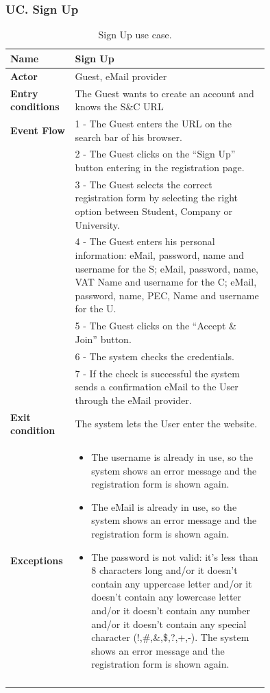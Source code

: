 \subsubsection*{UC\cuc . Sign Up}
\begin{center}
    \begin{longtable}{|l|p{0.75\linewidth}|}
        \hline
        \textbf{Name}               & Sign Up\\
        \hline
        \textbf{Actor}              & Guest, eMail provider\\
        \hline
        \textbf{Entry conditions}   & The Guest wants to create an account and knows the S\&C URL\\
        \hline
        \textbf{Event Flow}         & 1 - The Guest enters the URL on the search bar of his browser.    \\
        & 2 - The Guest clicks on the “Sign Up” button entering in the registration page.    \\
        & 3 - The Guest selects the correct registration form by selecting the right option between Student, Company or University. \\
        & 4 - The Guest enters his personal information: eMail, password, name and username for the S; eMail, password, name, VAT Name and username for the C; eMail, password, name, PEC, Name and username for the U. \\
        & 5 - The Guest clicks on the “Accept \& Join” button.  \\
        & 6 - The system checks the credentials.    \\
        & 7 - If the check is successful the system sends a confirmation eMail to the User through the eMail provider.  \\
        \hline
        \textbf{Exit condition}   & The system lets the User enter the website. \\       
        \hline
        \textbf{Exceptions}       & \begin{itemize}
            \item The username is already in use, so the system shows an error message and the registration form is shown again.
            \item The eMail is already in use, so the system shows an error message and the registration form is shown again.
            \item The password is not valid: it’s less than 8 characters long and/or it doesn’t contain any uppercase letter and/or it doesn’t contain any lowercase letter and/or it doesn’t contain any number and/or it doesn’t contain any special character (!,\#,\&,\$,?,+,-). The system shows an error message and the registration form is shown again.
        \end{itemize}\\
        \hline
        \caption{Sign Up use case.}
        \label{tab: sign_up_use_case}
    \end{longtable}
\end{center}



